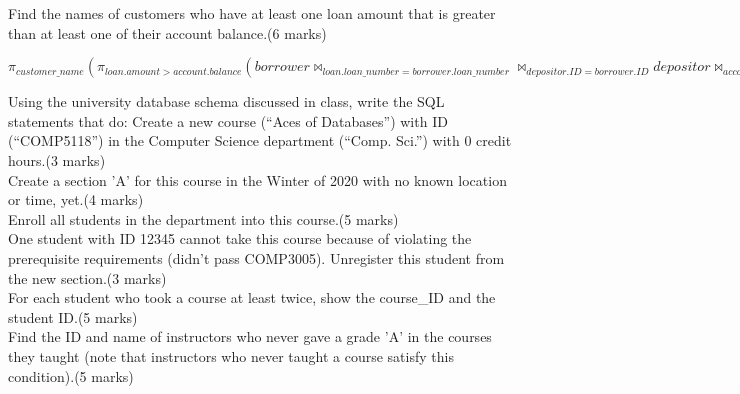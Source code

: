 \documentclass[a4 paper]{article}
\begin{document}
\begin{comment}
$\pi_{ID}$($\sigma$branch\_name="Ottawa"$\land$ balance$>$50000(branch))
$\pi_{ID}(\sigma _{branch\_name="Ottawa"\land balance>50000}(depositor\bowtie _{depositor.account\_number=account.account\_number}(account)\bowtie(account\bowtie _{account.branch\_name=branch.branch\_name}(branch)))$
\end{comment}

 Find the names of customers who have at least one loan amount that is greater than at least one of their account balance.\indent (6 marks)\\

\begin{comment}
$\pi$name($\sigma$branch\_name="Ottawa"$\land$ loan$>$50000(customers))
\end{comment}

$\pi _{customer\_name}(\pi _{loan.amount>account.balance}(borrower\bowtie _{loan.loan\_number = borrower.loan\_number}\bowtie _{depositor.ID = borrower.ID} depositor\bowtie _{account\_number = depositor.account\_number} account \bowtie _{customer.ID = borrower.ID} customer))$


Using the university database schema discussed in class, write the SQL statements that do:
 Create a new course (``Aces of Databases'') with ID (``COMP5118'') in the Computer Science department (``Comp. Sci.'') with 0 credit hours.\indent (3 marks)\\


 Create a section 'A' for this course in the Winter of 2020 with no known location or time, yet.\indent (4 marks)\\


 Enroll all students in the department into this course.\indent(5 marks)\\


 One student with ID 12345 cannot take this course because of violating the prerequisite requirements (didn't pass COMP3005). Unregister this student from the new section.\indent (3 marks)\\


 For each student who took a course at least twice, show the course\_ID and the student ID.\indent (5 marks)\\


 Find the ID and name of instructors who never gave a grade 'A' in the courses they taught (note that instructors who never taught a course satisfy this condition).\indent (5 marks)\\
\end{document}
